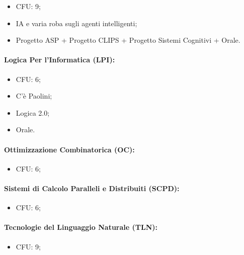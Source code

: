 \begin{itemize}
  \item CFU: 9;
  \item IA e varia roba sugli agenti intelligenti;
  \item Progetto ASP + Progetto CLIPS + Progetto Sistemi Cognitivi + Orale.
\end{itemize}

\paragraph{Logica Per l'Informatica (LPI):}

\begin{itemize}
  \item CFU: 6;
  \item C'è Paolini;
  \item Logica 2.0;
  \item Orale.
\end{itemize}

\paragraph{Ottimizzazione Combinatorica (OC):}

\begin{itemize}
  \item CFU: 6;
\end{itemize}

\paragraph{Sistemi di Calcolo Paralleli e Distribuiti (SCPD):}

\begin{itemize}
  \item CFU: 6;
\end{itemize}

\paragraph{Tecnologie del Linguaggio Naturale (TLN):}

\begin{itemize}
  \item CFU: 9;
\end{itemize}
